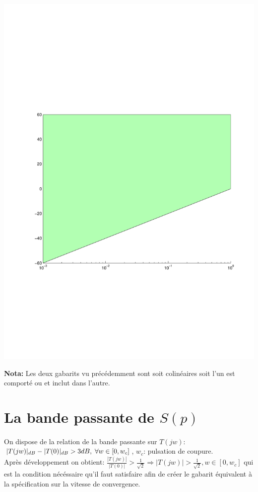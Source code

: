 \documentclass[12pt, a4paper, openany]{report}
\begin{document}
  \begin{center}
    \includegraphics[scale=0.5]{gabarit1.pdf}
    \label{fig5}
  \end{center}
  
 \textbf{Nota:} \hspace{2mm} Les deux gabarits vu précédemment sont soit colinéaires soit l'un est comporté ou et inclut dans l'autre.\\
 

 \section{La bande passante de $S(p)$}
 
 \paragraph{}
 On dispose de la relation de la bande passante sur $T(jw)$: $|T(jw)|_{dB}-|T(0)|_{dB}>3dB,\hspace{1mm} \forall w\in[0, w_{c}]$, $w_{c}$: pulsation de coupure.\\
 Après développement on obtient: $\frac{|T(jw)|}{|T(0)|}>\frac{1}{\sqrt{2}} \Rightarrow |T(jw)|>\frac{1}{\sqrt{2}}, w\in[0, w_{c}]$ qui est la condition nécéssaire qu'il faut satisfaire afin de créer le gabarit équivalent à la spécification sur la vitesse de convergence.\\
 
\end{document}

